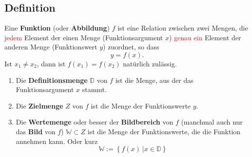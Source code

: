 \subsection{Definition}
Eine \textbf{Funktion} (oder \textbf{Abbildung}) $f$ ist eine Relation zwischen zwei Mengen, die \textcolor{red}{jedem} Element der einen Menge (Funktionsargument $x$) \textcolor{red}{genau ein} Element der anderen Menge (Funktionswert $y$) zuordnet, so dass $$y=f(x).$$
Ist $x_1 \neq x_2$, dann ist $f(x_1) = f(x_2)$ natürlich zulässig.
\begin{enumerate}
\item Die \textbf{Definitionsmenge} $\mathbb{D}$ von $f$ ist die Menge, aus der das Funktionsargument $x$ stammt.
\item Die \textbf{Zielmenge} $Z$ von $f$ ist die Menge der Funktionswerte $y$.
\item Die \textbf{Wertemenge} oder besser der \textbf{Bildbereich} von $f$ (manchmal auch nur das \textbf{Bild} von $f$) $\mathbb{W} \subset Z$ ist die Menge der Funktionswerte, die die Funktion annehmen kann. Oder kurz
\begin{equation*}
\mathbb{W} := \left\{ f(x) \ | x \in \mathbb{D} \right\}
\end{equation*}
\end{enumerate}
